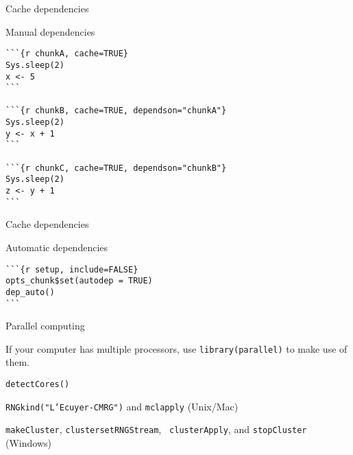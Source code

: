 \documentclass[12pt,t]{beamer}
\begin{document}
\begin{frame}[fragile]{Cache dependencies}

\vspace{18pt}

Manual dependencies
\bigskip

\begin{lstlisting}
```{r chunkA, cache=TRUE}
Sys.sleep(2)
x <- 5
```

```{r chunkB, cache=TRUE, dependson="chunkA"}
Sys.sleep(2)
y <- x + 1
```

```{r chunkC, cache=TRUE, dependson="chunkB"}
Sys.sleep(2)
z <- y + 1
```
\end{lstlisting}

\end{frame}


\begin{frame}[fragile]{Cache dependencies}

\vspace{18pt}

Automatic dependencies
\bigskip

\begin{lstlisting}
```{r setup, include=FALSE}
opts_chunk$set(autodep = TRUE)
dep_auto()
```
\end{lstlisting}


\end{frame}





\begin{frame}{Parallel computing}

\vspace{18pt}

If your computer has multiple processors, use {\tt library(parallel)}
to make use of them.

\bbi
\item {\tt detectCores()}
\item {\tt \hilit RNGkind("L'Ecuyer-CMRG")} and {\tt \hilit mclapply} (Unix/Mac)
\item {\tt \hilit makeCluster}, {\tt \hilit clustersetRNGStream}, {\tt
  \hilit clusterApply}, and {\tt \hilit stopCluster} (Windows)
\ei

\end{frame}
\end{document}
